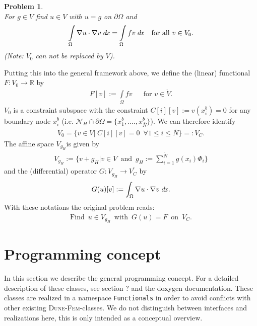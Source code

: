 \documentclass[a4paper,11pt]{article}
\numberwithin{equation}{section}
\newtheorem{problem}[definition]{Problem}
\newcommand{\theoremNewline}{\hspace{1mm}\\}
\newcommand{\Code}[1]{\texttt{#1}}
\newcommand{\dunefem}{\textsc{Dune-Fem}\xspace}
\newcommand{\hnS}{\hspace{-1.25pt}}
\newcommand{\dx}{\;d\hnS x}
\newcommand{\R}{\mathbb{R}}
\begin{document}
      \begin{problem}\theoremNewline
      For $g \in V$ find $u \in V$ with $u=g$ on $\partial \Omega$ and
      \begin{align*}
      \int\limits_{\Omega} \nabla u \cdot \nabla v \dx = \int\limits_{\Omega} f v \dx &&\text{for all }v \in V_0.
      \end{align*}
      (Note: $V_0$ can not be replaced by $V$).
      \end{problem}

      Putting this into the general framework above, we define the (linear) functional
      ${F: V_0 \rightarrow \R}$ by
      \begin{align*}
        F[v] := \int\limits_{\Omega} f v &&\text{for } v \in \mathring{V}.
      \end{align*}
      $V_0$ is a constraint subspace with the constraint $C[i][v] := v(x_i^b) = 0$ for any boundary node
      $x_i^b$ (i.e. $\mathcal{N}_H \cap \partial \Omega = \{ x_1^b, ...., x_{\bar{N}}^b\}$). We can therefore identify
      \begin{align*}
        V_0 = \{ v \in V| \hspace{3pt} C[i][v] = 0 \enspace \forall 1\le i\le \bar{N} \} =: V_C.
      \end{align*}
      The affine space $V_{g_H}$is given by
      \begin{align*}
        V_{g_H} :=
          \Big\{
            v + g_H
          \Big|
            v \in V \enspace \mbox{and} \enspace g_H := \sum_{i=1}^{\tilde{N}} g(x_i) \Phi_i
          \Big\}
      \end{align*}
      and the (differential) operator $G : V_{g_H} \rightarrow V_C^{\prime}$ by
      \begin{align*}
      G(u)[v] := \int_{\Omega} \nabla u \cdot \nabla v \dx.
      \end{align*}
      With these notations the original problem reads:
      \begin{align*}
      \text{Find} \enspace u \in V_{g_H} \enspace \mbox{with} \enspace G(u) = F \enspace \mbox{on} \enspace V_C.
      \end{align*}

  \section{Programming concept}

    In this section we describe the general programming concept. For a detailed description of these classes, see
    section ? and the doxygen documentation. These classes are realized in a namespace \Code{Functionals} in order to
    avoid conflicts with other existing \dunefem-classes. We do not distinguish between interfaces and realizations
    here, this is only intended as a conceptual overview.
\end{document}
